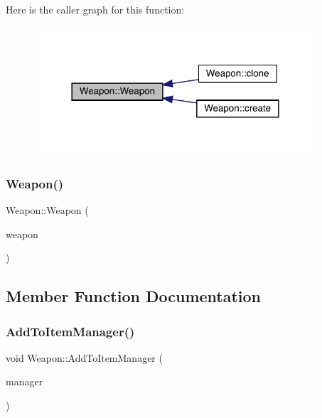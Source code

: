 Here is the caller graph for this function\+:\nopagebreak
\begin{figure}[H]
\begin{center}
\leavevmode
\includegraphics[width=298pt]{db/de5/class_weapon_a42dbc46dd70319a24763992c4ebbd396_icgraph}
\end{center}
\end{figure}
\mbox{\label{class_weapon_a167d8c34946b69123ddbb3ce7d739358}} 
\subsubsection{\texorpdfstring{Weapon()}{Weapon()}\hspace{0.1cm}{\footnotesize\ttfamily [3/3]}}
{\footnotesize\ttfamily Weapon\+::\+Weapon (\begin{DoxyParamCaption}\item[{const \mbox{\hyperlink{class_weapon}{Weapon}} \&}]{weapon }\end{DoxyParamCaption})}



\subsection{Member Function Documentation}
\mbox{\label{class_weapon_a241a74219d47374ffebebaad675dc250}} 
\subsubsection{\texorpdfstring{Add\+To\+Item\+Manager()}{AddToItemManager()}}
{\footnotesize\ttfamily void Weapon\+::\+Add\+To\+Item\+Manager (\begin{DoxyParamCaption}\item[{\mbox{\hyperlink{class_item_manager}{Item\+Manager}} \&}]{manager }\end{DoxyParamCaption})\hspace{0.3cm}{\ttfamily [virtual]}}




